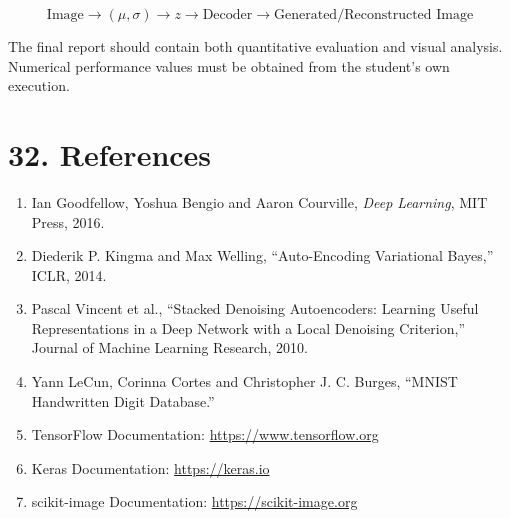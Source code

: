 \documentclass[10pt]{article}
\begin{document}
\[
\boxed{
\text{Image}
\rightarrow
(\mu,\sigma)
\rightarrow
z
\rightarrow
\text{Decoder}
\rightarrow
\text{Generated/Reconstructed Image}
}
\]

The final report should contain both quantitative evaluation and visual
analysis. Numerical performance values must be obtained from the student's
own execution.

\section*{32. References}

\begin{enumerate}
\item Ian Goodfellow, Yoshua Bengio and Aaron Courville,
\emph{Deep Learning}, MIT Press, 2016.

\item Diederik P. Kingma and Max Welling,
``Auto-Encoding Variational Bayes,'' ICLR, 2014.

\item Pascal Vincent et al.,
``Stacked Denoising Autoencoders: Learning Useful Representations in a Deep
Network with a Local Denoising Criterion,'' Journal of Machine Learning
Research, 2010.

\item Yann LeCun, Corinna Cortes and Christopher J. C. Burges,
``MNIST Handwritten Digit Database.''

\item TensorFlow Documentation:
\url{https://www.tensorflow.org}

\item Keras Documentation:
\url{https://keras.io}

\item scikit-image Documentation:
\url{https://scikit-image.org}
\end{enumerate}
\end{document}

